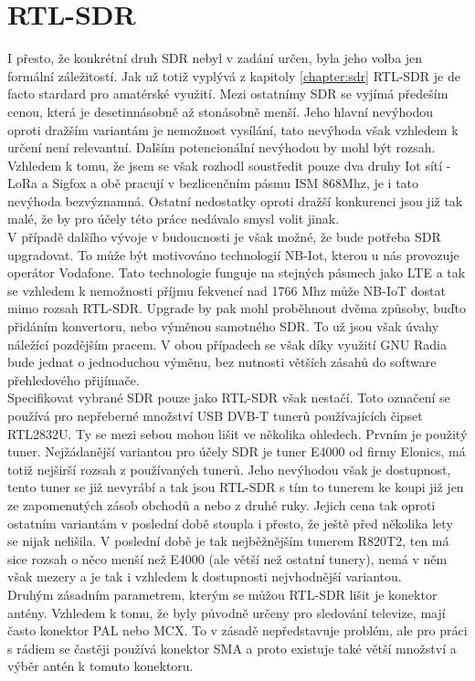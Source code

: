 \documentclass{ctuthesis}
\begin{document}
\section{RTL-SDR} \label{hwrtlsdr}

I přesto, že konkrétní druh SDR nebyl v zadání určen, byla jeho volba jen formální záležitostí. Jak už totiž vyplývá z kapitoly \ref{chapter:sdr} RTL-SDR je de facto stardard pro amatérské využití. Mezi ostatnímy SDR se vyjímá předeším cenou, která je desetinnásobně až stonásobně menší. Jeho hlavní nevýhodou oproti dražším variantám je nemožnost vysílání, tato nevýhoda však vzhledem k určení není relevantní. Dalším potencionální nevýhodou by mohl být rozsah. Vzhledem k tomu, že jsem se však rozhodl soustředit pouze dva druhy Iot sítí - LoRa a Sigfox a obě pracují v bezlicenčním pásmu ISM 868Mhz, je i tato nevýhoda bezvýznamná. Ostatní nedostatky oproti dražší konkurenci jsou již tak malé, že by pro účely této práce nedávalo smysl volit jinak.\\
V případě dalšího vývoje v budoucnosti je však možné, že bude potřeba SDR upgradovat. To může být motivováno technologií NB-Iot, kterou u nás provozuje operátor Vodafone. Tato technologie funguje na stejných pásmech jako LTE a tak se vzhledem k nemožnosti příjmu fekvencí nad 1766 Mhz může NB-IoT dostat mimo rozsah RTL-SDR. Upgrade by pak mohl proběhnout dvěma způsoby, buďto přidáním konvertoru, nebo výměnou samotného SDR. To už jsou však úvahy náležící pozdějším pracem. V obou případech se však díky využití GNU Radia bude jednat o jednoduchou výměnu, bez nutnosti větších zásahů do software přehledového přijímače.\\
Specifikovat vybrané SDR pouze jako RTL-SDR však nestačí. Toto označení se používá pro nepřeberné množství USB DVB-T tunerů používajících čipset RTL2832U. Ty se mezi sebou mohou lišit ve několika ohledech. Prvním je použitý tuner. Nejžádanější variantou pro účely SDR je tuner E4000 od firmy Elonics, má totiž nejširší rozsah z používaných tunerů. \cite{osmocom} Jeho nevýhodou však je dostupnost, tento tuner se již nevyrábí a tak jsou RTL-SDR s tím to tunerem ke koupi již jen ze zapomenutých zásob obchodů a nebo z druhé ruky. Jejich cena tak oproti ostatním variantám v poslední době stoupla i přesto, že ještě před několika lety se nijak nelišila. V poslední době je tak nejběžnějším tunerem R820T2, ten má sice rozsah o něco menší než E4000 (ale větší než ostatní tunery), nemá v něm však mezery a je tak i vzhledem k dostupnosti nejvhodnější variantou.\\
Druhým zásadním parametrem, kterým se můžou RTL-SDR lišit je konektor antény. Vzhledem k tomu, že byly původně určeny pro sledování televize, mají často konektor PAL nebo MCX. \cite{rtlsdrcom} To v zásadě nepředstavuje problém, ale pro práci s rádiem se častěji používá konektor SMA a proto existuje také větší množství a výběr antén k tomuto konektoru.\\
\end{document}
